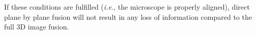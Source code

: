  If these conditions are fulfilled (\textit{i.e.}, the microscope is properly aligned), direct plane by plane fusion will not result in any loss of information compared to the full 3D image fusion.






